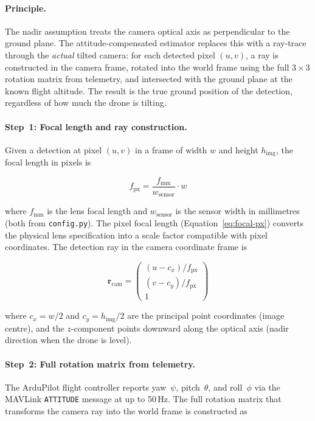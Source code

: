 \paragraph{Principle.}
The nadir assumption treats the camera optical axis as perpendicular to the ground plane.  The attitude-compensated estimator replaces this with a ray-trace through the \emph{actual} tilted camera: for each detected pixel $(u, v)$, a ray is constructed in the camera frame, rotated into the world frame using the full $3 \times 3$ rotation matrix from telemetry, and intersected with the ground plane at the known flight altitude.  The result is the true ground position of the detection, regardless of how much the drone is tilting.

\paragraph{Step~1: Focal length and ray construction.}
Given a detection at pixel $(u, v)$ in a frame of width $w$ and height $h_\mathrm{img}$, the focal length in pixels is

\begin{equation}\label{eq:focal-px}
  f_\mathrm{px} = \frac{f_\mathrm{mm}}{w_\mathrm{sensor}} \cdot w
\end{equation}

\noindent where $f_\mathrm{mm}$ is the lens focal length and $w_\mathrm{sensor}$ is the sensor width in millimetres (both from \texttt{config.py}).  The pixel focal length (Equation~\ref{eq:focal-px}) converts the physical lens specification into a scale factor compatible with pixel coordinates.  The detection ray in the camera coordinate frame is

\begin{equation}\label{eq:ray-cam}
  \mathbf{r}_\mathrm{cam} = \begin{pmatrix} (u - c_x) / f_\mathrm{px} \\ (v - c_y) / f_\mathrm{px} \\ 1 \end{pmatrix}
\end{equation}

\noindent where $c_x = w/2$ and $c_y = h_\mathrm{img}/2$ are the principal point coordinates (image centre), and the $z$-component points downward along the optical axis (nadir direction when the drone is level).

\paragraph{Step~2: Full rotation matrix from telemetry.}
The ArduPilot flight controller reports yaw~$\psi$, pitch~$\theta$, and roll~$\phi$ via the MAVLink \texttt{ATTITUDE} message at up to 50\,Hz.  The full rotation matrix that transforms the camera ray into the world frame is constructed as

